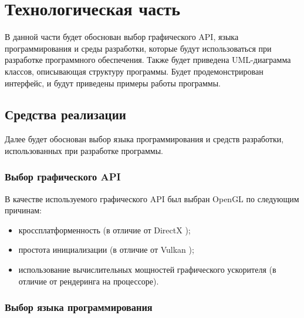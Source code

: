 \section{Технологическая часть}

В данной части будет обоснован выбор графического API, языка программирования и среды разработки, которые будут использоваться при разработке программного обеспечения.
Также будет приведена UML-диаграмма классов, описывающая структуру программы.
Будет продемонстрирован интерфейс, и будут приведены примеры работы программы.

\subsection{Средства реализации}

Далее будет обоснован выбор языка программирования и средств разработки, использованных при разработке программы.

\subsubsection{Выбор графического API}

В качестве используемого графического API был выбран OpenGL \cite{opengl} по следующим причинам:
\begin{itemize}
    \item кроссплатформенность (в отличие от DirectX \cite{dx});
    \item простота инициализации (в отличие от Vulkan \cite{vk});
    \item использование вычислительных мощностей графического ускорителя (в отличие от рендеринга на процессоре).
\end{itemize}

\subsubsection{Выбор языка программирования}

